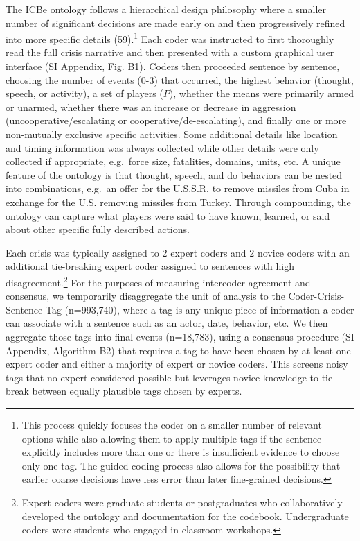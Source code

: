 \documentclass{article}
\begin{document}
The ICBe ontology follows a hierarchical design philosophy where a
smaller number of significant decisions are made early on and then
progressively refined into more specific details (59).\footnote{This
  process quickly focuses the coder on a smaller number of relevant
  options while also allowing them to apply multiple tags if the
  sentence explicitly includes more than one or there is insufficient
  evidence to choose only one tag. The guided coding process also allows
  for the possibility that earlier coarse decisions have less error than
  later fine-grained decisions.} Each coder was instructed to first
thoroughly read the full crisis narrative and then presented with a
custom graphical user interface (SI Appendix, Fig. B1). Coders then
proceeded sentence by sentence, choosing the number of events (0-3) that
occurred, the highest behavior (thought, speech, or activity), a set of
players (\(P\)), whether the means were primarily armed or unarmed,
whether there was an increase or decrease in aggression
(uncooperative/escalating or cooperative/de-escalating), and finally one
or more non-mutually exclusive specific activities. Some additional
details like location and timing information was always collected while
other details were only collected if appropriate, e.g.~force size,
fatalities, domains, units, etc. A unique feature of the ontology is
that thought, speech, and do behaviors can be nested into combinations,
e.g.~an offer for the U.S.S.R. to remove missiles from Cuba in exchange
for the U.S. removing missiles from Turkey. Through compounding, the
ontology can capture what players were said to have known, learned, or
said about other specific fully described actions.

Each crisis was typically assigned to 2 expert coders and 2 novice
coders with an additional tie-breaking expert coder assigned to
sentences with high disagreement.\footnote{Expert coders were graduate
  students or postgraduates who collaboratively developed the ontology
  and documentation for the codebook. Undergraduate coders were students
  who engaged in classroom workshops.} For the purposes of measuring
intercoder agreement and consensus, we temporarily disaggregate the unit
of analysis to the Coder-Crisis-Sentence-Tag (n=993,740), where a tag is
any unique piece of information a coder can associate with a sentence
such as an actor, date, behavior, etc. We then aggregate those tags into
final events (n=18,783), using a consensus procedure (SI Appendix,
Algorithm B2) that requires a tag to have been chosen by at least one
expert coder and either a majority of expert or novice coders. This
screens noisy tags that no expert considered possible but leverages
novice knowledge to tie-break between equally plausible tags chosen by
experts.
\end{document}
